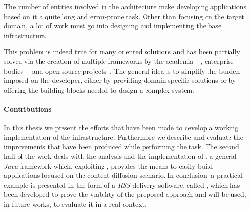 The number of
entities involved in the architecture make developing applications
based on it a quite long and error-prone task. Other than focusing on
the target domain, a lot of work must go into designing and implementing
the base infrastructure.

This problem is indeed true for many \ptop oriented solutions
and has been partially solved via the creation of multiple frameworks
by the academia~\cite{AntHill}~\cite{P2PFramework},
enterprise bodies~\cite{JXTA}~\cite{dotNETp2p} and open-source
projects~\cite{GNUnet}. The general idea is to simplify the burden
imposed on the developer, either by providing domain specific solutions
or by offering the building blocks needed to design a complex system.

\paragraph{Contributions} In this thesis we present the efforts that
have been made to develop a working implementation of the \cloudcast
infrastructure. Furthermore we describe and evaluate the improvements
that have been produced while performing the task. The second half of
the work deals with the analysis and the implementation of
\cloudypeer, a general \textit{Java} framework which, exploiting \cloudcast,
provides the means to easily build applications focused on the content
diffusion scenario. In conclusion, a practical example is presented in
the form of a \textit{RSS} delivery software, called \cloudyrss, which
has been developed to prove the viability of the proposed approach and
will be used, in future works, to evaluate it in a real context.
